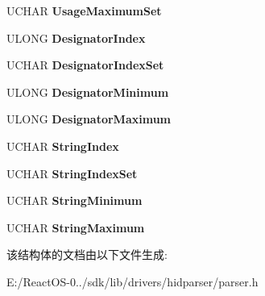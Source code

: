 \begin{DoxyCompactItemize}
U\+C\+H\+AR {\bfseries Usage\+Maximum\+Set}
\item 
\mbox{\label{struct_l_o_c_a_l___i_t_e_m___s_t_a_t_e_aced572d622429e909d8c7abd916d4f10}} 
U\+L\+O\+NG {\bfseries Designator\+Index}
\item 
\mbox{\label{struct_l_o_c_a_l___i_t_e_m___s_t_a_t_e_a78c22510960db534b8bdb36e05c503df}} 
U\+C\+H\+AR {\bfseries Designator\+Index\+Set}
\item 
\mbox{\label{struct_l_o_c_a_l___i_t_e_m___s_t_a_t_e_a1626ff653e65dea91227ad2769a49dbe}} 
U\+L\+O\+NG {\bfseries Designator\+Minimum}
\item 
\mbox{\label{struct_l_o_c_a_l___i_t_e_m___s_t_a_t_e_ac4ceefb960efafb93a74831c095927e0}} 
U\+L\+O\+NG {\bfseries Designator\+Maximum}
\item 
\mbox{\label{struct_l_o_c_a_l___i_t_e_m___s_t_a_t_e_ae2da07bf4a8bcd4ae587bf37dd10da90}} 
U\+C\+H\+AR {\bfseries String\+Index}
\item 
\mbox{\label{struct_l_o_c_a_l___i_t_e_m___s_t_a_t_e_a71dc99d449036f58a0e4bfa4953edbe9}} 
U\+C\+H\+AR {\bfseries String\+Index\+Set}
\item 
\mbox{\label{struct_l_o_c_a_l___i_t_e_m___s_t_a_t_e_a0a660782a1c585fbd57c47c9a5f345a1}} 
U\+C\+H\+AR {\bfseries String\+Minimum}
\item 
\mbox{\label{struct_l_o_c_a_l___i_t_e_m___s_t_a_t_e_a82e24f605c9b69b6c6475447d69e030a}} 
U\+C\+H\+AR {\bfseries String\+Maximum}
\end{DoxyCompactItemize}


该结构体的文档由以下文件生成\+:\begin{DoxyCompactItemize}
\item 
E\+:/\+React\+O\+S-\/0../sdk/lib/drivers/hidparser/parser.\+h\end{DoxyCompactItemize}
